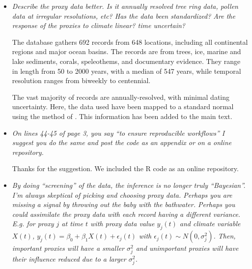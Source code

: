 \documentclass[11pt]{article}
\begin{document}
\begin{itemize}
\item \textit{Describe the proxy data better. Is it annually resolved tree ring
    data, pollen data at irregular resolutions, etc? Has the data been
    standardized? Are the response of the proxies to climate linear? time
    uncertain?}

  The database gathers 692 records from 648 locations, including all continental regions and major ocean basins. The records are from trees, ice, marine and lake sediments, corals, speleothems, and documentary evidence. They range in length from 50 to 2000 years, with a median of 547 years, while temporal resolution ranges from biweekly to centennial.

  The vast majority of records are annually-resolved, with minimal dating uncertainty. Here, the data used have been mapped to a standard normal using the method of \cite{vanAlbada2007}. This information has been added to the main text.
  
\item \textit{On lines 44-45 of page 3, you say “to ensure reproducible
    workflows” I suggest you do the same and post the code as an appendix or on
    a online repository.}

  Thanks for the suggestion. We included the R code as an online repository.

  
\item \textit{By doing “screening” of the data, the inference is no longer truly
    “Bayesian”. I'm always skeptical of picking and choosing proxy data. Perhaps
    you are missing a signal by throwing out the baby with the bathwater.
    Perhaps you could assimilate the proxy data with each record having a
    different variance. E.g. for proxy $j$ at time $t$ with proxy data value $y_j(t)$ and climate variable $X(t)$, $y_j(t)=\beta_0+\beta_1X(t)+\epsilon_j(t)$
with $\epsilon_j(t)\sim N(0,\sigma_j^2)$. Then, important proxies will have a
smaller $\sigma_j^2$ and unimportant proxies will have their influence reduced due to a larger $\sigma_j^2$.
}


\end{itemize}
\end{document}
